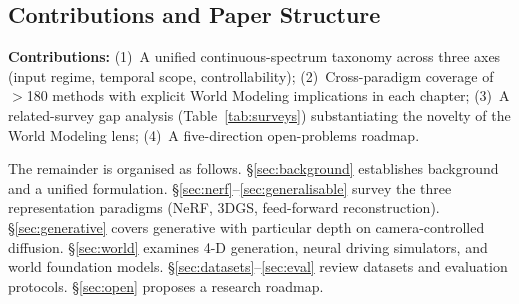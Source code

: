 \subsection{Contributions and Paper Structure}

\textbf{Contributions:}
(1)~A unified continuous-spectrum taxonomy across three axes (input regime,
temporal scope, controllability);
(2)~Cross-paradigm coverage of $>$180 methods with explicit World Modeling
implications in each chapter;
(3)~A related-survey gap analysis (Table~\ref{tab:surveys}) substantiating
the novelty of the World Modeling lens;
(4)~A five-direction open-problems roadmap.

The remainder is organised as follows.
\S\ref{sec:background} establishes background and a unified formulation.
\S\ref{sec:nerf}--\ref{sec:generalisable} survey the three representation
paradigms (NeRF, 3DGS, feed-forward reconstruction).
\S\ref{sec:generative} covers generative \nvs{} with particular depth on
camera-controlled diffusion.
\S\ref{sec:world} examines 4-D generation, neural driving simulators, and
world foundation models.
\S\ref{sec:datasets}--\ref{sec:eval} review datasets and evaluation protocols.
\S\ref{sec:open} proposes a research roadmap.


